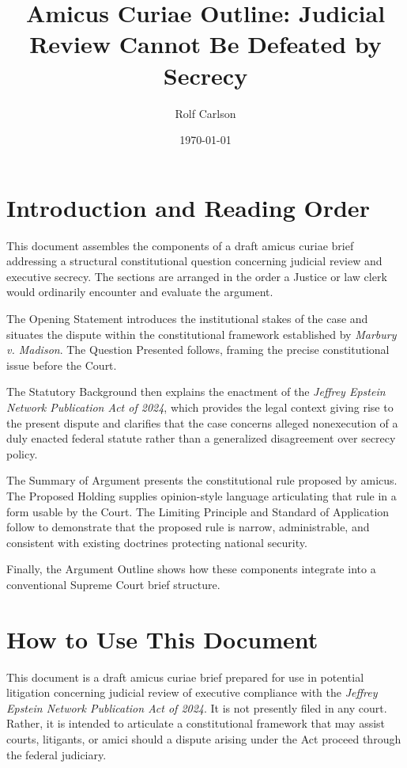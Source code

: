 \documentclass[12pt]{article}
\title{Amicus Curiae Outline: Judicial Review Cannot Be Defeated by Secrecy}
\author{Rolf Carlson}
\date{\today}
\begin{document}
\maketitle

\section*{Introduction and Reading Order}

This document assembles the components of a draft amicus curiae brief addressing a structural constitutional question concerning judicial review and executive secrecy.
The sections are arranged in the order a Justice or law clerk would ordinarily encounter and evaluate the argument.

The Opening Statement introduces the institutional stakes of the case and situates the dispute within the constitutional framework established by \emph{Marbury v. Madison}.
The Question Presented follows, framing the precise constitutional issue before the Court.

The Statutory Background then explains the enactment of the \emph{Jeffrey Epstein Network Publication Act of 2024}, which provides the legal context giving rise to the present dispute and clarifies that the case concerns alleged nonexecution of a duly enacted federal statute rather than a generalized disagreement over secrecy policy.

The Summary of Argument presents the constitutional rule proposed by amicus.
The Proposed Holding supplies opinion-style language articulating that rule in a form usable by the Court.
The Limiting Principle and Standard of Application follow to demonstrate that the proposed rule is narrow, administrable, and consistent with existing doctrines protecting national security.

Finally, the Argument Outline shows how these components integrate into a conventional Supreme Court brief structure.

\section*{How to Use This Document}

This document is a draft amicus curiae brief prepared for use in potential litigation concerning judicial review of executive compliance with the \emph{Jeffrey Epstein Network Publication Act of 2024}.
It is not presently filed in any court.
Rather, it is intended to articulate a constitutional framework that may assist courts, litigants, or amici should a dispute arising under the Act proceed through the federal judiciary.
\end{document}
